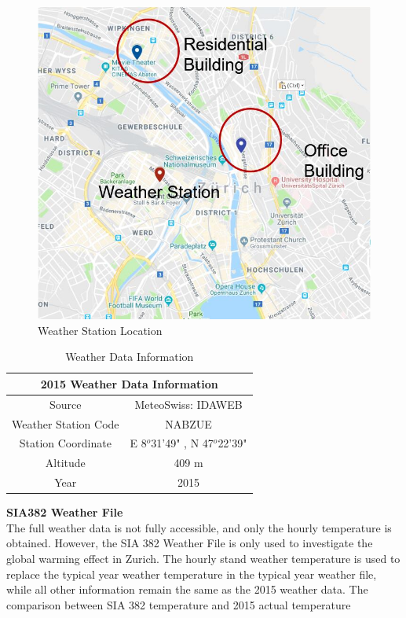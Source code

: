 \documentclass[a4paper, oneside]{discothesis}
\begin{document}
				\begin{figure}[H]
				\centering
				\includegraphics[scale=0.7]{WeatherStation.jpg}
				\caption{Weather Station Location}
				\label{fig:NABZUE}
				\end{figure}
				
				\begin{table}[htbp]
				  \centering
				  \caption{Weather Data Information}
				    \begin{tabular}{|c|c|}
				    \toprule
				    \multicolumn{2}{|c|}{\textbf{2015 Weather Data Information}} \\
				    \midrule
				    Source & MeteoSwiss: IDAWEB \\
				    \midrule
				    Weather Station Code & NABZUE \\
				    \midrule
				    Station Coordinate & E 8$^o$31'49" , N 47$^o$22'39" \\
				    \midrule
				    Altitude & 409 m \\
				    \midrule
				    Year & 2015 \\
				    \bottomrule
				    \end{tabular}%
				  \label{tab:2015DataInformation}%
				\end{table}%



			\textbf{SIA382 Weather File}\\
				The full weather data is not fully accessible, and only the hourly temperature is obtained. However, the SIA 382 Weather File is only used to investigate the global warming effect in Zurich. The hourly stand weather temperature is used to replace the typical year weather temperature in the typical year weather file, while all other information remain the same as the 2015 weather data. The comparison between SIA 382 temperature and 2015 actual temperature \\ 
\end{document}
